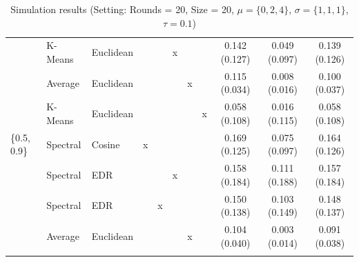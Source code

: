 \documentclass[12pt,a4paper,bibliography=totocnumbered,listof=totocnumbered]{scrartcl}
\begin{document}
{\begin{appendix}
\begin{table}[H]
\begin{tabularx}{\textwidth}{ lllcccccccc}
& K-Means & Euclidean &  &  & x &  &  & 0.142 (0.127) & 0.049 (0.097) & 0.139 (0.126) \\ 
& Average & Euclidean &  &  &  & x &  & 0.115 (0.034) & 0.008 (0.016) & 0.100 (0.037) \\ 
& K-Means & Euclidean &  &  &  &  & x & 0.058 (0.108) & 0.016 (0.115) & 0.058 (0.108) \\ 
\{0.5, 0.9\} & Spectral & Cosine & x &  &  &  &  & 0.169 (0.125) & 0.075 (0.097) & 0.164 (0.126) \\ 
& Spectral & EDR &  &  & x &  &  & 0.158 (0.184) & 0.111 (0.188) & 0.157 (0.184) \\ 
& Spectral & EDR &  & x &  &  &  & 0.150 (0.138) & 0.103 (0.149) & 0.148 (0.137) \\ 
& Average & Euclidean &  &  &  & x &  & 0.104 (0.040) & 0.003 (0.014) & 0.091 (0.038) \\ 
\hline \\[-1.8ex] 
	\end{tabularx} 
	\caption{Simulation results (Setting: Rounds = 20, Size = 20, $\mu = \{0,2,4\}$, $\sigma =  \{1,1,1\}$, $\tau = 0.1$)} 
		\label{tab:apstab6}
\end{table} 


\end{appendix}}
\end{document}
